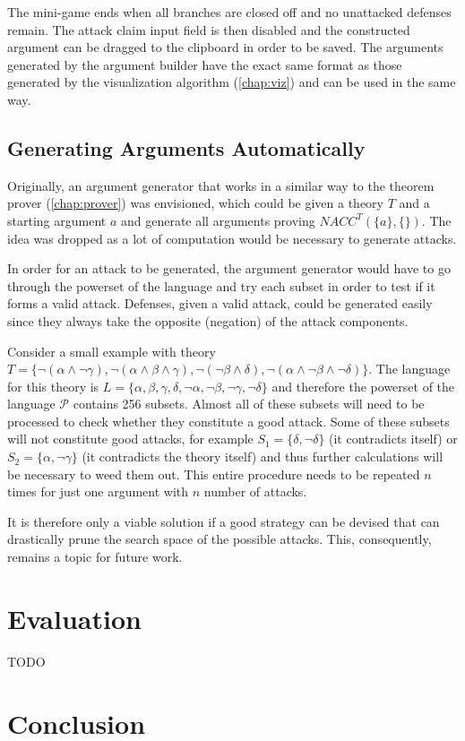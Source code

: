 \documentclass[11pt,twoside,a4paper]{report}
\begin{document}
The mini-game ends when all branches are closed off and no unattacked defenses remain. The attack claim input field is then disabled and the constructed argument can be dragged to the clipboard in order to be saved. The arguments generated by the argument builder have the exact same format as those generated by the visualization algorithm (\autoref{chap:viz}) and can be used in the same way.

\section{Generating Arguments Automatically}
Originally, an argument generator that works in a similar way to the theorem prover (\autoref{chap:prover}) was envisioned, which could be given a theory $T$ and a starting argument $a$ and generate all arguments proving $NACC^T(\{a\},\{ \})$. The idea was dropped as a lot of computation would be necessary to generate attacks.

In order for an attack to be generated, the argument generator would have to go through the powerset of the language and try each subset in order to test if it forms a valid attack. Defenses, given a valid attack, could be generated easily since they always take the opposite (negation) of the attack components.

Consider a small example with theory $T = \{\neg(\alpha\wedge\neg\gamma), \neg(\alpha\wedge\beta\wedge\gamma), \neg(\neg\beta\wedge\delta), \neg(\alpha\wedge\neg\beta\wedge\neg\delta)\}$. The language for this theory is $L = \{\alpha, \beta, \gamma, \delta, \neg\alpha, \neg\beta, \neg\gamma, \neg\delta\}$ and therefore the powerset of the language $\mathcal{P}$ contains 256 subsets. Almost all of these subsets will need to be processed to check whether they constitute a good attack. Some of these subsets will not constitute good attacks, for example $S_1 = \{\delta, \neg\delta\}$ (it contradicts itself) or $S_2 = \{\alpha, \neg\gamma\}$ (it contradicts the theory itself) and thus further calculations will be necessary to weed them out. This entire procedure needs to be repeated $n$ times for just one argument with $n$ number of attacks.

It is therefore only a viable solution if a good strategy can be devised that can drastically prune the search space of the possible attacks. This, consequently, remains a topic for future work.

\chapter{Evaluation}
\label{chap:eval}
TODO

\chapter{Conclusion}
\label{chap:chiliconclusion}

\listoffigures

\lstlistoflistings



\end{document}

